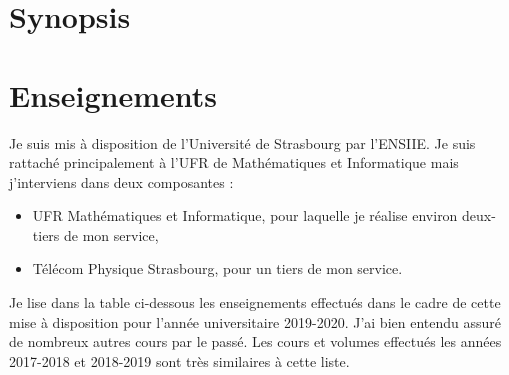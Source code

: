 





\section{Synopsis}




\section{Enseignements}

Je suis mis à  disposition de l'Université de Strasbourg par l'ENSIIE. Je suis 
rattaché principalement à l'UFR de Mathématiques et Informatique mais j'interviens
dans deux composantes :
\begin{itemize}
\item UFR Mathématiques et Informatique, pour laquelle je réalise environ
  deux-tiers de mon service,
\item Télécom Physique Strasbourg, pour un tiers de mon service.
\end{itemize}

\bigskip
Je lise dans  la table ci-dessous les enseignements effectués  dans le cadre de
cette mise à disposition pour l'année universitaire 2019-2020. J'ai bien entendu
assuré de  nombreux autres cours par  le passé.  Les cours  et volumes effectués
les années 2017-2018 et 2018-2019 sont très similaires à cette liste.

